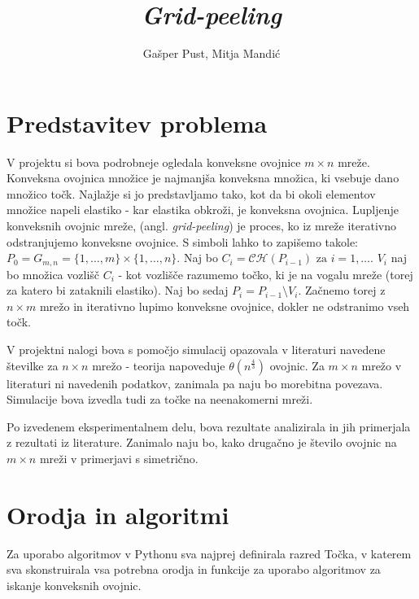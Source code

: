 \documentclass[a4paper]{article}
\title{\textit{Grid-peeling}}
\author{Gašper Pust, Mitja Mandić}
\begin{document}
\begin{titlepage}
 \maketitle
\end{titlepage}
%

\section{Predstavitev problema}
V projektu si bova podrobneje ogledala konveksne ovojnice $m \times n$ mreže. Konveksna ovojnica množice je najmanjša konveksna množica, ki vsebuje dano množico točk.
Najlažje si jo predstavljamo tako, kot da bi okoli elementov množice napeli elastiko - kar elastika obkroži, je konveksna ovojnica. Lupljenje konveksnih ovojnic mreže,
(angl. \textit{grid-peeling}) je proces, ko iz mreže iterativno odstranjujemo konveksne ovojnice. S simboli lahko to zapišemo takole:
$ P_{0} = G_{m,n} = \{1,\ldots, m\} \times \{1, \ldots, n\}$. Naj bo $C_{i} = \mathcal{C}\mathcal{H}(P_{i-1}) \text{ za } i = 1, \ldots$. $V_{i}$ naj bo množica vozlišč $C_{i}$
- kot vozlišče razumemo točko, ki je na vogalu mreže (torej za katero bi zataknili elastiko). Naj bo sedaj $P_{i} = P_{i-1} \setminus V_{i}$. Začnemo torej z $n \times m$ mrežo 
in iterativno lupimo konveksne ovojnice, dokler ne odstranimo vseh točk.

V projektni nalogi bova s pomočjo simulacij opazovala v literaturi navedene številke za $n \times n$ mrežo - teorija napoveduje $\theta(n ^ \frac{4}{3})$ ovojnic.
Za $m \times n$ mrežo v literaturi ni navedenih podatkov, zanimala pa naju bo morebitna povezava. Simulacije bova izvedla tudi za točke na neenakomerni mreži.

Po izvedenem eksperimentalnem delu, bova rezultate analizirala in jih primerjala z rezultati iz literature. Zanimalo naju bo, kako drugačno je število ovojnic na $m \times n$
mreži v primerjavi s simetrično.

\newpage
\section{Orodja in algoritmi}
Za uporabo algoritmov v Pythonu sva najprej definirala razred Točka, v katerem sva skonstruirala vsa potrebna orodja in funkcije za uporabo algoritmov za iskanje konveksnih ovojnic.
\end{document}
